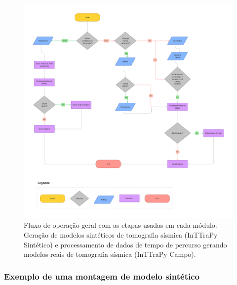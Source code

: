 \documentclass[a4paper, 12 pt]{article} %
\begin{document}
\begin{figure}[!hbtp]
	\begin{center}
		\includegraphics[scale=0.189]{Figuras/Portela_TCC.png}
	\end{center}
	\caption{Fluxo de operação geral com as etapas usadas em cada módulo: Geração de modelos sintéticos de tomografia sísmica (InTTraPy Sintético) e processamento de dados de tempo de percurso gerando modelos reais de tomografia sísmica (InTTraPy Campo).}
	\label{fluxo_grama}
\end{figure} 

\subsubsection{Exemplo de uma montagem de modelo sintético}
\end{document}
